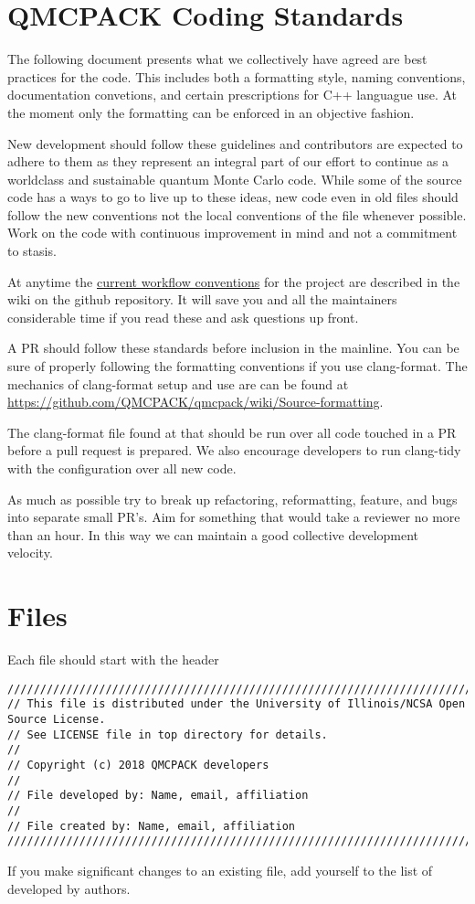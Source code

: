 \section{QMCPACK Coding Standards}

The following document presents what we collectively have agreed are best practices for the code. This includes both a formatting style, naming conventions, documentation convetions, and certain prescriptions for C++ languague use. At the moment only the formatting can be enforced in an objective fashion.

New development should follow these guidelines and contributors are expected to adhere to them as they represent an integral part of our effort to continue \qmcpack as a worldclass and sustainable quantum Monte Carlo code. While some of the source code has a ways to go to live up to these ideas, new code even in old files should follow the new conventions not the local conventions of the file whenever possible. Work on the code with continuous improvement in mind and not a commitment to stasis.

At anytime the \href{https://github.com/QMCPACK/qmcpack/wiki/Development-workflow}{current workflow conventions} for the project are described in the wiki on the github repository. It will save you and all the maintainers considerable time if you read these and ask questions up front.

A PR should follow these standards before inclusion in the mainline. You can be sure of properly following the formatting conventions if you use clang-format.  The mechanics of clang-format setup and use are can be found at \url{https://github.com/QMCPACK/qmcpack/wiki/Source-formatting}.

The clang-format file found at  that should be run over all code touched in a PR before a pull request is prepared. We also encourage developers to run clang-tidy with the  configuration over all new code.

As much as possible try to break up refactoring, reformatting, feature, and bugs into separate small PR's. Aim for something that would take a reviewer no more than an hour. In this way we can maintain a good collective development velocity.

\section{Files}
Each file should start with the header
\lstset{language=C++,style=C++}
\begin{lstlisting}
//////////////////////////////////////////////////////////////////////////////////////
// This file is distributed under the University of Illinois/NCSA Open Source License.
// See LICENSE file in top directory for details.
//
// Copyright (c) 2018 QMCPACK developers
//
// File developed by: Name, email, affiliation
//
// File created by: Name, email, affiliation
//////////////////////////////////////////////////////////////////////////////////////
\end{lstlisting}
If you make significant changes to an existing file, add yourself to the list of developed by authors.

